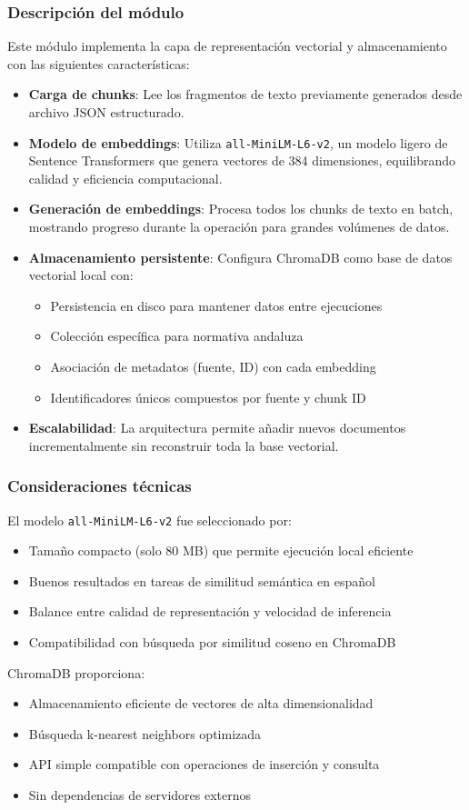 \documentclass[a4paper,12pt]{article}
\begin{document}
\subsubsection*{Descripción del módulo}

Este módulo implementa la capa de representación vectorial y almacenamiento con las siguientes características:

\begin{itemize}
    \item \textbf{Carga de chunks}: Lee los fragmentos de texto previamente generados desde archivo JSON estructurado.
    
    \item \textbf{Modelo de embeddings}: Utiliza \texttt{all-MiniLM-L6-v2}, un modelo ligero de Sentence Transformers que genera vectores de 384 dimensiones, equilibrando calidad y eficiencia computacional.
    
    \item \textbf{Generación de embeddings}: Procesa todos los chunks de texto en batch, mostrando progreso durante la operación para grandes volúmenes de datos.
    
    \item \textbf{Almacenamiento persistente}: Configura ChromaDB como base de datos vectorial local con:
    \begin{itemize}
        \item Persistencia en disco para mantener datos entre ejecuciones
        \item Colección específica para normativa andaluza
        \item Asociación de metadatos (fuente, ID) con cada embedding
        \item Identificadores únicos compuestos por fuente y chunk ID
    \end{itemize}
    
    \item \textbf{Escalabilidad}: La arquitectura permite añadir nuevos documentos incrementalmente sin reconstruir toda la base vectorial.
\end{itemize}

\subsubsection*{Consideraciones técnicas}

El modelo \texttt{all-MiniLM-L6-v2} fue seleccionado por:
\begin{itemize}
    \item Tamaño compacto (solo 80 MB) que permite ejecución local eficiente
    \item Buenos resultados en tareas de similitud semántica en español
    \item Balance entre calidad de representación y velocidad de inferencia
    \item Compatibilidad con búsqueda por similitud coseno en ChromaDB
\end{itemize}

ChromaDB proporciona:
\begin{itemize}
    \item Almacenamiento eficiente de vectores de alta dimensionalidad
    \item Búsqueda k-nearest neighbors optimizada
    \item API simple compatible con operaciones de inserción y consulta
    \item Sin dependencias de servidores externos
\end{itemize}
\end{document}
